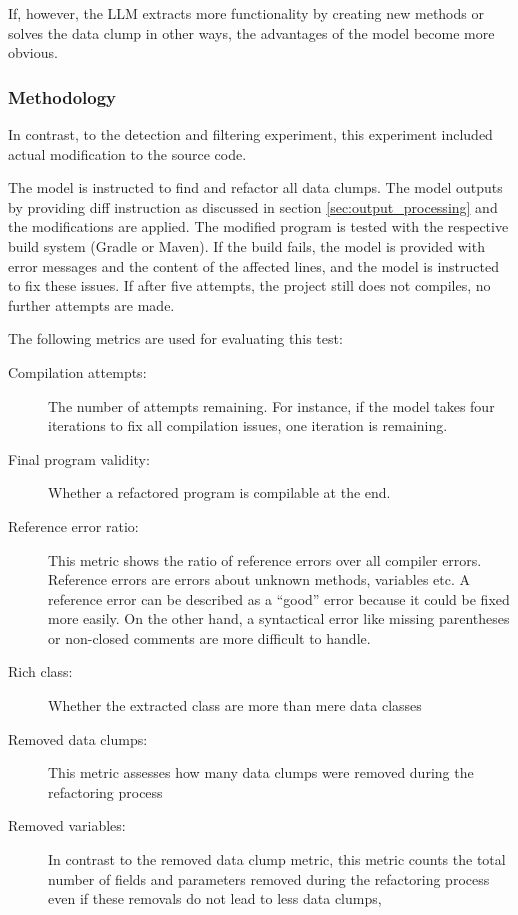 If, however, the \ac{LLM} extracts more functionality by creating new methods or solves the data clump in other ways, the advantages of the model become more obvious.



\subsubsection{Methodology}

In contrast, to the detection and filtering experiment, this experiment included actual modification to the source code. 

The model is instructed to find and refactor all data clumps. 
The model outputs by providing diff instruction as discussed in section \ref{sec:output_processing} and the modifications are applied.  The modified program is tested with the respective build system (Gradle or Maven). If the build fails, the model is provided with error messages and the content of the affected lines, and the model is instructed to fix these issues. If after five attempts, the project still does not compiles, no further attempts are made. 

The following metrics are used for evaluating this test:

\begin{description}
    \item [Compilation attempts:] The number of attempts remaining. For instance, if the model takes four iterations to fix all compilation issues, one iteration is remaining. 
    \item[Final program validity:] Whether a refactored program is compilable at the end. 
   \item [Reference error ratio:] This metric shows the ratio of reference errors over all compiler errors. Reference errors are errors about unknown methods, variables etc.  A reference error can be described as  a \enquote{good} error because it could be fixed more easily. On the other hand, a syntactical error like missing parentheses or non-closed comments are more difficult to handle. 
    \item [Rich class:] Whether the extracted class are more than mere data classes
   
    \item [Removed data clumps:] This metric assesses how many data clumps were removed during the refactoring process

    \item [Removed variables:] In contrast to the removed data clump metric, this metric counts the total number of fields and parameters removed during the refactoring process even if these removals do not lead to less data clumps, 
\end{description}



